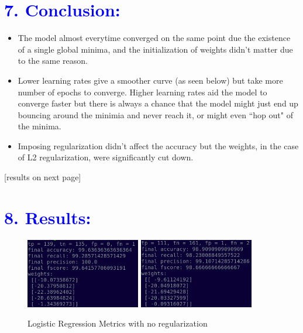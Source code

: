 \documentclass[a4paper,10pt,twocolumn]{article}
\begin{document}
\section*{\textcolor{blue}{7. Conclusion:}}
\begin{itemize}
\item{The model almost everytime converged on the same point due the existence of a single global minima, and the initialization of weights didn't matter due to the same reason.}
\item{Lower learning rates give a smoother curve (as seen below) but take more number of epochs to converge. Higher learning rates aid the model to converge faster but there is always a chance that the model might just end up bouncing around the minimia and never reach it, or might even ``hop out" of the minima.}
\item{Imposing regularization didn't affect the accuracy but the weights, in the case of L2 regularization, were significantly cut down.}
\end{itemize}
[results on next page]

\newpage
\onecolumn
\section*{\textcolor{blue}{8. Results:}}
\begin{figure}[h!]
\centering
\includegraphics[scale=1.0, width=5cm]{Fig1.png}
\includegraphics[scale=1.0, width=5cm]{Fig2.png}
\caption*{Logistic Regression Metrics with no regularization}
\end{figure}
\end{document}
